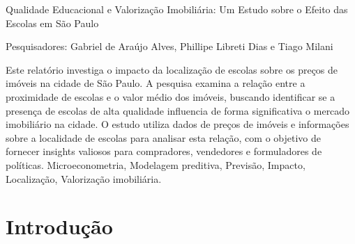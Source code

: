 \relatorio
{Qualidade Educacional e Valorização Imobiliária: Um Estudo sobre o Efeito das Escolas em São Paulo}
{
    \noindent Pesquisadores: Gabriel de Araújo Alves, Phillipe Libreti Dias e Tiago Milani
    
}
{
    Este relatório investiga o impacto da localização de escolas sobre os preços de imóveis na cidade de São Paulo. A pesquisa examina a relação entre a proximidade de escolas e o valor médio dos imóveis, buscando identificar se a presença de escolas de alta qualidade influencia de forma significativa o mercado imobiliário na cidade. O estudo utiliza dados de preços de imóveis e informações sobre a localidade de escolas para analisar esta relação, com o objetivo de fornecer insights valiosos para compradores, vendedores e formuladores de políticas.
}
{Microeconometria, Modelagem preditiva, Previsão, Impacto, Localização, Valorização imobiliária.}

\section{Introdução}




